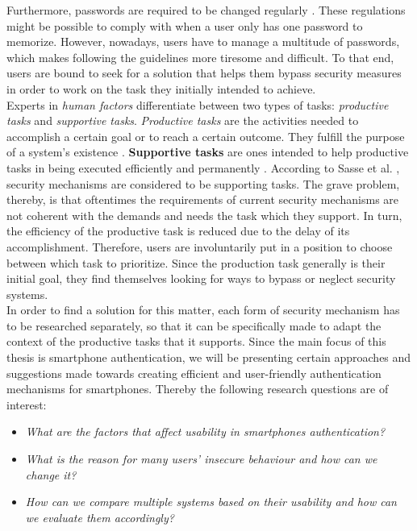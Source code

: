 Furthermore, passwords are required to be changed regularly \cite{adams2,gorman}. These regulations might be possible to comply with when a user only has one password to memorize. However, nowadays, users have to manage a multitude of passwords, which makes following the guidelines more tiresome and difficult. To that end, users are bound to seek for a solution that helps them bypass security measures in order to work on the task they initially intended to achieve.\\

Experts in \textit{human factors} differentiate between two types of tasks: \textit{productive tasks} and \textit{supportive tasks}. \textit{Productive tasks} are the activities needed to accomplish a certain goal or to reach a certain outcome. They fulfill the purpose of a system's existence \cite{sasse}. \textbf{Supportive tasks} are ones intended to help productive tasks in being executed efficiently and permanently \cite{sasse}. According to Sasse et al. \cite{sasse}, security mechanisms are considered to be supporting tasks. The grave problem, thereby, is that oftentimes the requirements of current security mechanisms are not coherent with the demands and needs the task which they support. In turn, the efficiency of the productive task is reduced due to the delay of its accomplishment.  Therefore, users are involuntarily put in a position to choose between which task to prioritize. Since the production task generally is their initial goal, they find themselves looking for ways to bypass or neglect security systems.\\

In order to find a solution for this matter, each form of security mechanism has to be researched separately, so that it can be specifically made to adapt the context of the productive tasks that it supports. Since the main focus of this thesis is smartphone authentication, we will be presenting certain approaches and suggestions made towards creating efficient and user-friendly authentication mechanisms for smartphones. Thereby the following research questions are of interest: 

\begin{itemize}
    \item \textit{What are the factors that affect usability in smartphones authentication?}
\item \textit{What is the reason for many users' insecure behaviour and how can we change it?} 
    \item \textit{How can we compare multiple systems based on their usability and how can we evaluate them accordingly?}
\end{itemize}

